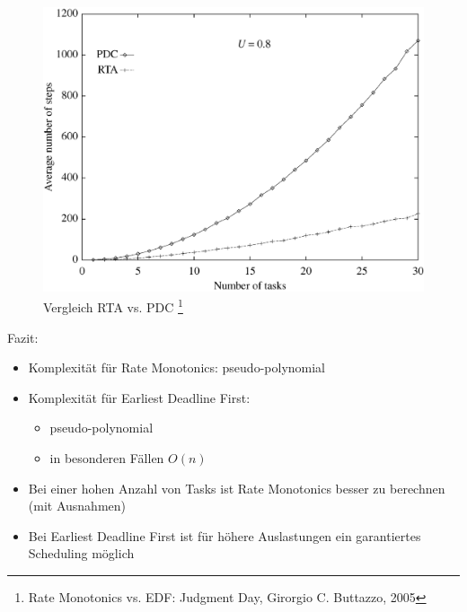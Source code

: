 \begin{frame}{\subsecname}
	\begin{center}
	\begin{figure}
		\includegraphics[scale=.20]{graphics/vergleich/rtapdc.png}
		\caption{Vergleich RTA vs. PDC \footnote{Rate Monotonics vs. EDF: Judgment Day, Girorgio C. Buttazzo, 2005}}	
	\end{figure}

	\end{center}
\end{frame}

\begin{frame}{\subsecname}
	Fazit:
	\begin{itemize}
		\item Komplexität für Rate Monotonics: pseudo-polynomial
		\item Komplexität für Earliest Deadline First:
		\begin{itemize}
			\item pseudo-polynomial
			\item in besonderen Fällen $O(n)$
		\end{itemize}
		\item Bei einer hohen Anzahl von Tasks ist Rate Monotonics besser zu berechnen (mit Ausnahmen)
		\item Bei Earliest Deadline First ist für höhere Auslastungen ein garantiertes Scheduling möglich
	\end{itemize}
\end{frame}

